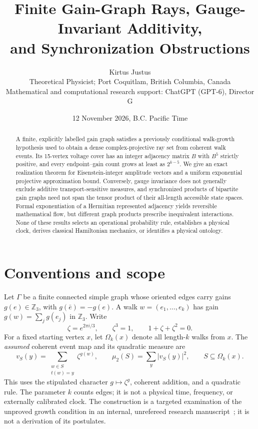 \documentclass[11pt]{article}
\title{Finite Gain-Graph Rays, Gauge-Invariant Additivity,\\ and Synchronization Obstructions}
\author{Kirtus Justus\\\small Theoretical Physicist; Port Coquitlam, British Columbia, Canada\\[3pt]\small Mathematical and computational research support: ChatGPT (GPT-6), Director G}
\date{12 November 2026, B.C. Pacific Time}
\newcommand{\Z}{\mathbb Z}
\begin{document}
\maketitle
\begin{abstract}
A finite, explicitly labelled gain graph satisfies a previously conditional walk-growth hypothesis used to obtain a dense complex-projective ray set from coherent walk events. Its 15-vertex voltage cover has an integer adjacency matrix $B$ with $B^5$ strictly positive, and every endpoint--gain count grows at least as $2^{k-5}$. We give an exact realization theorem for Eisenstein-integer amplitude vectors and a uniform exponential projective approximation bound. Conversely, gauge invariance does not generally exclude additive transport-sensitive measures, and synchronized products of bipartite gain graphs need not span the tensor product of their all-length accessible state spaces. Formal exponentiation of a Hermitian represented adjacency yields reversible mathematical flow, but different graph products prescribe inequivalent interactions. None of these results selects an operational probability rule, establishes a physical clock, derives classical Hamiltonian mechanics, or identifies a physical ontology.
\end{abstract}

\section{Conventions and scope}
Let $\Gamma$ be a finite connected simple graph whose oriented edges carry gains $g(e)\in\Z_3$, with $g(\bar e)=-g(e)$. A walk $w=(e_1,\ldots,e_k)$ has gain $g(w)=\sum_jg(e_j)$ in $\Z_3$. Write
\[
\zeta=e^{2\pi i/3},\qquad \zeta^3=1,\qquad 1+\zeta+\zeta^2=0.
\]
For a fixed starting vertex $x$, let $\Omega_k(x)$ denote all length-$k$ walks from $x$. The \emph{assumed} coherent event map and its quadratic measure are
\begin{equation}
 v_S(y)=\sum_{\substack{w\in S\\t(w)=y}}\zeta^{g(w)},\qquad
 \mu_2(S)=\sum_y|v_S(y)|^2, \qquad S\subseteq\Omega_k(x).
 \label{eq:event}
\end{equation}
This uses the stipulated character $g\mapsto\zeta^g$, coherent addition, and a quadratic rule. The parameter $k$ counts edges; it is not a physical time, frequency, or externally calibrated clock. The construction is a targeted examination of the unproved growth condition in an internal, unrefereed research manuscript~\cite{G8}; it is not a derivation of its postulates.
\end{document}
